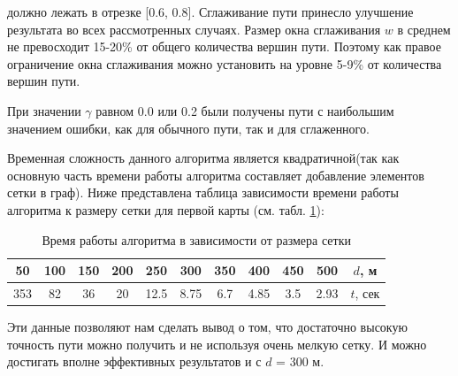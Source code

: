 должно лежать в отрезке [0.6, 0.8]. Сглаживание пути принесло улучшение результата во
всех рассмотренных случаях. Размер окна сглаживания $w$ в среднем не превосходит 15-20\%
от общего количества вершин пути. Поэтому как правое ограничение окна
сглаживания можно установить на уровне 5-9\% от количества вершин пути.
\par
При значении $\gamma$ равном 0.0 или 0.2 были получены пути с наибольшим
значением ошибки, как для обычного пути, так и для сглаженного.
\par
Временная сложность данного алгоритма является квадратичной(так как основную часть времени
работы алгоритма составляет добавление элементов сетки в граф). Ниже представлена
таблица зависимости времени работы алгоритма к размеру сетки для первой карты (см. табл. \ref{tabular:accuracy_time_1}):
\begin{table}[H]
	\centering
	\caption{Время работы алгоритма в зависимости от размера сетки}
	\label{tabular:accuracy_time_1}
\begin{tabular}{|c|c|c|c|c|c|c|c|c|c|c|}
		\hline
		50 & 100 &	150 &	200 &	250 &	300 &	350 &	400 &	450 &	500 &	$d$, м \\ \hline
		353	& 82 &	36 &	20	& 12.5 &	8.75 &	6.7 &	4.85 &	3.5	& 2.93 &	$t$, сек \\ \hline
\end{tabular}
\end{table}
\vspace{2mm}
\par
Эти данные позволяют нам сделать вывод о том, что достаточно
высокую точность пути можно получить и не используя очень мелкую сетку.
И можно достигать вполне эффективных результатов и с $d$ = 300 м.
